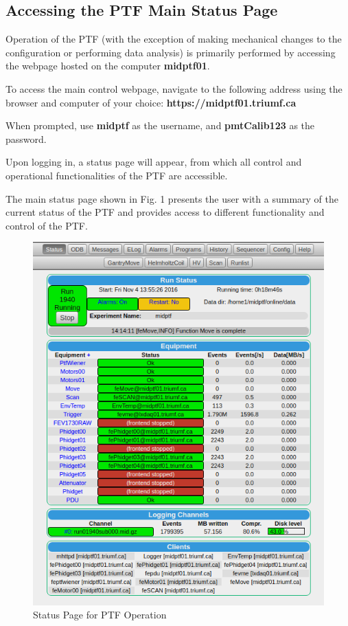 \documentclass[twoside,letterpaper]{refart}
\begin{document}
\subsection{Accessing the PTF Main Status Page}

Operation of the PTF (with the exception of making mechanical changes to the configuration or performing data analysis) is primarily performed by accessing the webpage hosted on the computer \textbf{midptf01}. 

To access the main control webpage, navigate to the following address using the browser and computer of your choice: \textbf{https://midptf01.triumf.ca}

When prompted, use \textbf{midptf} as the username, and \textbf{pmtCalib123} as the password. 

Upon logging in, a status page will appear, from which all control and operational functionalities of the PTF are accessible. 

The main status page shown in Fig. 1 presents the user with a summary of the current status of the PTF and provides access to different functionality and control of the PTF.  

\FloatBarrier

\begin{figure}[!htpb]
	\centering	
	\includegraphics[scale=0.5]{images/midptfStatusPage.png}
	\caption{Status Page for PTF Operation}
	 \label{statusPage}
\end{figure}
\end{document}

